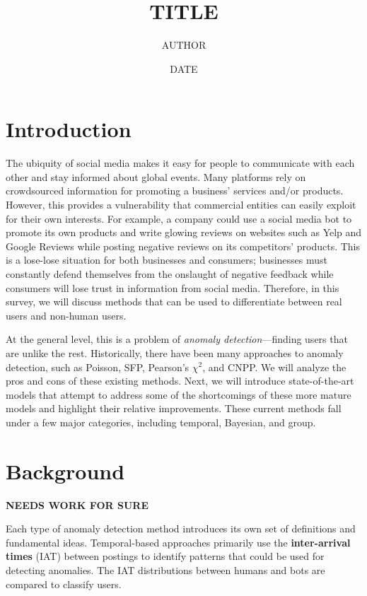\documentclass[11pt, oneside]{article}   	%
\title{TITLE}
\author{AUTHOR}
\date{DATE}							%
\begin{document}
\maketitle

\section*{Introduction}

\quad The ubiquity of social media makes it easy for people to communicate with each other and stay informed about global events.
Many platforms rely on crowdsourced information for promoting a business' services and/or products.
However, this provides a vulnerability that commercial entities can easily exploit for their own interests.
For example, a company could use a social media bot to promote its own products and write glowing reviews on websites such as Yelp and Google Reviews while posting negative reviews on its competitors' products.
This is a lose-lose situation for both businesses and consumers; businesses must constantly defend themselves from the onslaught of negative feedback while consumers will lose trust in information from social media.
Therefore, in this survey, we will discuss methods that can be used to differentiate between real users and non-human users.

\quad At the general level, this is a problem of \textit{anomaly detection}---finding users that are unlike the rest.
Historically, there have been many approaches to anomaly detection, such as Poisson, SFP, Pearson's $\chi^2$, and CNPP.
We will analyze the pros and cons of these existing methods.
Next, we will introduce state-of-the-art models that attempt to address some of the shortcomings of these more mature models and highlight their relative improvements. 
These current methods fall under a few major categories, including temporal, Bayesian, and group.

\section*{Background}

\textbf{NEEDS WORK FOR SURE}

\quad Each type of anomaly detection method introduces its own set of definitions and fundamental ideas.
Temporal-based approaches primarily use the \textbf{inter-arrival times} (IAT) between postings to identify patterns that could be used for detecting anomalies.
The IAT distributions between humans and bots are compared to classify users.
\end{document}
